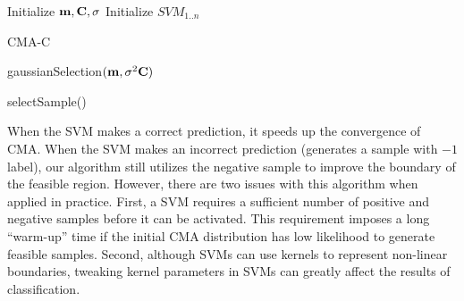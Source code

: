 \begin{algorithm}
  Initialize $\mathbf{m}, \mathbf{C}, \sigma$\;
  Initialize $SVM_{1..n}$\;

  \caption{CMA-C}
  \label{alg:parkour_ccma}
\end{algorithm}
\begin{algorithm}

  \Return gaussianSelection$(\mathbf{m}, \sigma^2\mathbf{C})$\;
  \caption{selectSample()}
  \label{alg:parkour_selection}
\end{algorithm}


When the SVM makes a correct prediction,  it speeds up the convergence
of CMA. When the SVM makes an incorrect prediction (\ie generates a
sample with $-1$ label), our algorithm
still utilizes the negative sample to improve the boundary of the feasible
region. However, there are two
issues with this algorithm when applied in practice. 
First, a SVM requires a sufficient number of positive and
negative samples before it can be activated. This requirement
imposes a long ``warm-up'' time if the initial CMA distribution has
low likelihood to generate feasible samples. 
Second, although SVMs
can use kernels to represent non-linear boundaries, tweaking kernel
parameters in SVMs can greatly affect the results of
classification.


